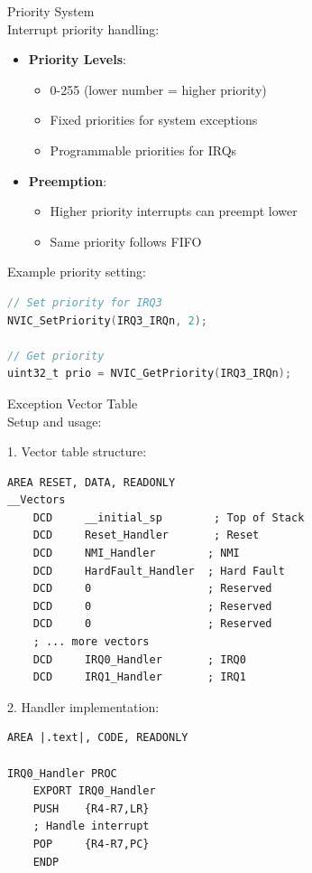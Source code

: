 \begin{concept}{Priority System}\\
Interrupt priority handling:
\begin{itemize}
  \item \textbf{Priority Levels}:
    \begin{itemize}
      \item 0-255 (lower number = higher priority)
      \item Fixed priorities for system exceptions
      \item Programmable priorities for IRQs
    \end{itemize}
  \item \textbf{Preemption}:
    \begin{itemize}
      \item Higher priority interrupts can preempt lower
      \item Same priority follows FIFO
    \end{itemize}
\end{itemize}

Example priority setting:
\begin{lstlisting}[language=C, style=basesmol]
// Set priority for IRQ3
NVIC_SetPriority(IRQ3_IRQn, 2);

// Get priority
uint32_t prio = NVIC_GetPriority(IRQ3_IRQn);
\end{lstlisting}
\end{concept}

\begin{KR}{Exception Vector Table}\\
Setup and usage:

1. Vector table structure:
\begin{lstlisting}[language=armasm, style=basesmol]
    AREA RESET, DATA, READONLY
__Vectors
    DCD     __initial_sp        ; Top of Stack
    DCD     Reset_Handler       ; Reset
    DCD     NMI_Handler        ; NMI
    DCD     HardFault_Handler  ; Hard Fault
    DCD     0                  ; Reserved
    DCD     0                  ; Reserved
    DCD     0                  ; Reserved
    ; ... more vectors
    DCD     IRQ0_Handler       ; IRQ0
    DCD     IRQ1_Handler       ; IRQ1
\end{lstlisting}

2. Handler implementation:
\begin{lstlisting}[language=armasm, style=basesmol]
    AREA |.text|, CODE, READONLY
    
IRQ0_Handler PROC
    EXPORT IRQ0_Handler
    PUSH    {R4-R7,LR}
    ; Handle interrupt
    POP     {R4-R7,PC}
    ENDP
\end{lstlisting}
\end{KR}

